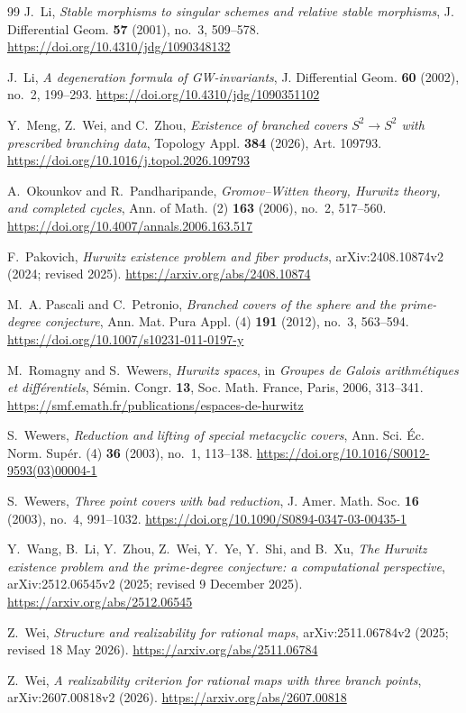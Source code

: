 \documentclass[11pt]{amsart}
\theoremstyle{plain}
\theoremstyle{definition}
\numberwithin{equation}{section}
\begin{document}
\begin{thebibliography}{99}
J.~Li,
\emph{Stable morphisms to singular schemes and relative stable morphisms},
J. Differential Geom. \textbf{57} (2001), no.~3, 509--578.
\url{https://doi.org/10.4310/jdg/1090348132}

J.~Li,
\emph{A degeneration formula of GW-invariants},
J. Differential Geom. \textbf{60} (2002), no.~2, 199--293.
\url{https://doi.org/10.4310/jdg/1090351102}

Y.~Meng, Z.~Wei, and C.~Zhou,
\emph{Existence of branched covers $S^2\to S^2$ with prescribed branching
data},
Topology Appl. \textbf{384} (2026), Art. 109793.
\url{https://doi.org/10.1016/j.topol.2026.109793}

A.~Okounkov and R.~Pandharipande,
\emph{Gromov--Witten theory, Hurwitz theory, and completed cycles},
Ann. of Math. (2) \textbf{163} (2006), no.~2, 517--560.
\url{https://doi.org/10.4007/annals.2006.163.517}

F.~Pakovich,
\emph{Hurwitz existence problem and fiber products},
arXiv:2408.10874v2 (2024; revised 2025).
\url{https://arxiv.org/abs/2408.10874}

M.~A. Pascali and C.~Petronio,
\emph{Branched covers of the sphere and the prime-degree conjecture},
Ann. Mat. Pura Appl. (4) \textbf{191} (2012), no.~3, 563--594.
\url{https://doi.org/10.1007/s10231-011-0197-y}

M.~Romagny and S.~Wewers,
\emph{Hurwitz spaces},
in \emph{Groupes de Galois arithm\'etiques et diff\'erentiels},
S\'emin. Congr. \textbf{13}, Soc. Math. France, Paris, 2006, 313--341.
\url{https://smf.emath.fr/publications/espaces-de-hurwitz}

S.~Wewers,
\emph{Reduction and lifting of special metacyclic covers},
Ann. Sci. \'{E}c. Norm. Sup\'er. (4) \textbf{36} (2003), no.~1, 113--138.
\url{https://doi.org/10.1016/S0012-9593(03)00004-1}

S.~Wewers,
\emph{Three point covers with bad reduction},
J. Amer. Math. Soc. \textbf{16} (2003), no.~4, 991--1032.
\url{https://doi.org/10.1090/S0894-0347-03-00435-1}

Y.~Wang, B.~Li, Y.~Zhou, Z.~Wei, Y.~Ye, Y.~Shi, and B.~Xu,
\emph{The Hurwitz existence problem and the prime-degree conjecture: a
computational perspective},
arXiv:2512.06545v2 (2025; revised 9 December 2025).
\url{https://arxiv.org/abs/2512.06545}

Z.~Wei,
\emph{Structure and realizability for rational maps},
arXiv:2511.06784v2 (2025; revised 18 May 2026).
\url{https://arxiv.org/abs/2511.06784}

Z.~Wei,
\emph{A realizability criterion for rational maps with three branch points},
arXiv:2607.00818v2 (2026).
\url{https://arxiv.org/abs/2607.00818}

\end{thebibliography}
\vspace{0.5cm}
\end{document}
